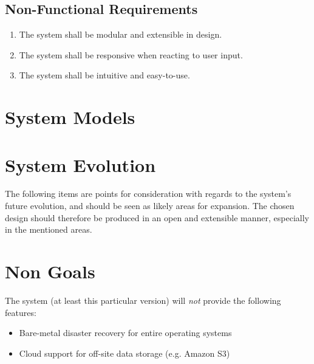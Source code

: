 \subsection{Non-Functional Requirements}

\begin{enumerate}
	\item The system shall be modular and extensible in design.
	\item The system shall be responsive when reacting to user input.
	\item The system shall be intuitive and easy-to-use.
\end{enumerate}

\section{System Models}

\section{System Evolution}

The following items are points for consideration with regards to the system's
future evolution, and should be seen as likely areas for expansion. The chosen
design should therefore be produced in an open and extensible manner,
especially in the mentioned areas.

\section{Non Goals}

The system (at least this particular version) will \emph{not} provide the
following features:

\begin{itemize}
    \item Bare-metal disaster recovery for entire operating systems
    \item Cloud support for off-site data storage (e.g. Amazon S3)
\end{itemize}
